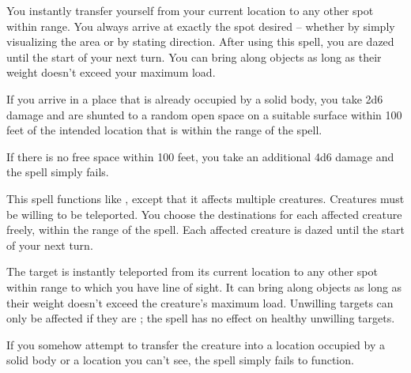 \spellrng{\rngext}
\begin{spelleffect}
  You instantly transfer yourself from your current location to any other spot within range. You always arrive at exactly the spot desired -- whether by simply visualizing the area or by stating direction. After using this spell, you are dazed until the start of your next turn. You can bring along objects as long as their weight doesn't exceed your maximum load.
\end{spelleffect}
\begin{spellnotes}
  \par If you arrive in a place that is already occupied by a solid body, you take 2d6 damage and are shunted to a random open space on a suitable surface within 100 feet of the intended location that is within the range of the spell.
  \par  If there is no free space within 100 feet, you take an additional 4d6 damage and the spell simply fails.
\end{spellnotes}

\begin{spelleffect}
  This spell functions like , except that it affects multiple creatures. Creatures must be willing to be teleported. You choose the destinations for each affected creature freely, within the range of the spell. Each affected creature is dazed until the start of your next turn.
\end{spelleffect}

\spellrng{\rngclose}
\begin{spelleffect}
    The target is instantly teleported from its current location to any other spot within range to which you have line of sight. It can bring along objects as long as their weight doesn't exceed the creature's maximum load. Unwilling targets can only be affected if they are \bloodied; the spell has no effect on healthy unwilling targets.
\end{spelleffect}
\begin{spellnotes}
    If you somehow attempt to transfer the creature into a location occupied by a solid body or a location you can't see, the spell simply fails to function.
\end{spellnotes}


